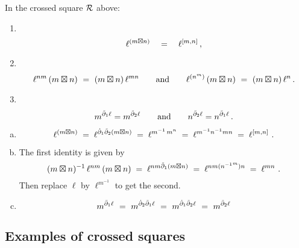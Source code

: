 \begin{lem} \label{lem:xsq}
In the crossed square  $\mathcal{R}$  above:
\begin{enumerate}[{\em (a)}]
\item~
$$
\ell^{(m \boxtimes n)} \quad = \quad \ell^{[m,n]}\,,
$$
\item~
$$
\ell^{nm}\,(m \boxtimes n) ~=~ (m \boxtimes n)\,\ell^{mn}
\qquad\mbox{and}\qquad
\ell^{(n^m)}\,(m \boxtimes n) ~=~ (m \boxtimes n)\,\ell^{n}\,.
$$
\item~
$$
m^{\ddot{\partial}_1\ell} = m^{\ddot{\partial}_2\ell}
\qquad\mbox{and}\qquad
n^{\ddot{\partial}_2\ell} = n^{\ddot{\partial}_1\ell}\,.
$$
\end{enumerate}
\end{lem}
\begin{pf}
\begin{enumerate}[(a)]
\item
$$
\ell^{(m \boxtimes n)}
  \;=\;  \ell^{\dot{\partial}_1\ddot{\partial}_2(m \boxtimes n)}
  \;=\;  \ell^{m^{-1}\,m^n}
  \;=\;  \ell^{m^{-1}n^{-1}mn}
  \;=\;  \ell^{[m,n]}~.
$$
\item
The first identity is given by
$$
(m \boxtimes n)^{-1}\,\ell^{nm}\,(m \boxtimes n) \;=\;
\ell^{nm\ddot{\partial}_1(m \boxtimes n)} \;=\;
\ell^{nm({n^{-1}}^m)n} \;=\;
\ell^{mn}~.
$$
Then replace $\ell$ by $\ell^{m^{-1}}$ to get the second.
\item
$$
m^{\ddot{\partial}_1\ell} ~=~ m^{\dot{\partial}_2\ddot{\partial}_1\ell} ~=~ m^{\dot{\partial}_1\ddot{\partial}_2\ell} 
~=~  m^{\ddot{\partial}_2\ell} 
$$
\end{enumerate}
\end{pf}


\subsection{Examples of crossed squares}

